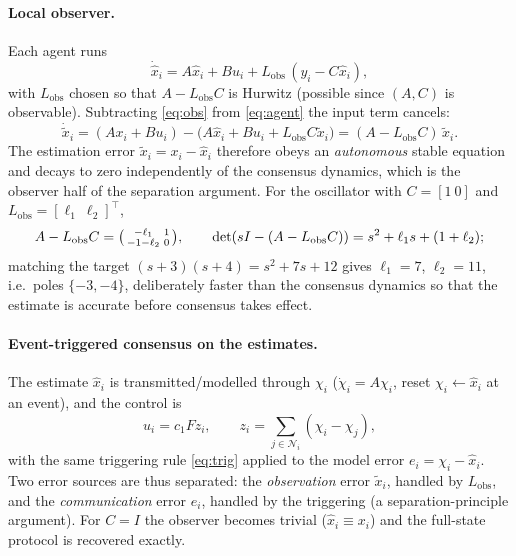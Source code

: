 \documentclass[11pt,a4paper]{article}
\theoremstyle{remark}
\newcommand{\Ni}{\mathcal{N}_i}
\newcommand{\T}{^{\top}}
\begin{document}
\paragraph{Local observer.} Each agent runs
\begin{equation}
\dot{\hat x}_i = A\hat x_i + B u_i + L_{\mathrm{obs}}\,(y_i - C\hat x_i),
\label{eq:obs}
\end{equation}
with $L_{\mathrm{obs}}$ chosen so that $A-L_{\mathrm{obs}}C$ is Hurwitz (possible since $(A,C)$ is
observable). Subtracting \eqref{eq:obs} from \eqref{eq:agent} the input term cancels:
\begin{equation}
\dot{\tilde x}_i = (Ax_i+Bu_i)-\big(A\hat x_i+Bu_i+L_{\mathrm{obs}}C\tilde x_i\big)
= (A-L_{\mathrm{obs}}C)\,\tilde x_i .
\label{eq:obs-err}
\end{equation}
The estimation error $\tilde x_i=x_i-\hat x_i$ therefore obeys an \emph{autonomous} stable equation
and decays to zero independently of the consensus dynamics, which is the observer half of the
separation argument. For the oscillator with $C=[1\ 0]$ and $L_{\mathrm{obs}}=[\ell_1\ \ell_2]\T$,
\[
A-L_{\mathrm{obs}}C=\begin{psmallmatrix}-\ell_1 & 1\\ -1-\ell_2 & 0\end{psmallmatrix},
\qquad \det(sI-(A-L_{\mathrm{obs}}C))=s^2+\ell_1 s+(1+\ell_2);
\]
matching the target $(s+3)(s+4)=s^2+7s+12$ gives $\ell_1=7$, $\ell_2=11$, i.e.\ poles $\{-3,-4\}$,
deliberately faster than the consensus dynamics so that the estimate is accurate before consensus
takes effect.

\paragraph{Event-triggered consensus on the estimates.} The estimate $\hat x_i$ is
transmitted/modelled through $\chi_i$ ($\dot\chi_i = A\chi_i$, reset
$\chi_i\!\leftarrow\!\hat x_i$ at an event), and the control is
\begin{equation}
u_i = c_1 F z_i,\qquad z_i = \sum_{j\in\Ni}(\chi_i - \chi_j),
\end{equation}
with the same triggering rule \eqref{eq:trig} applied to the model error
$e_i = \chi_i - \hat x_i$. Two error sources are thus separated: the \emph{observation} error
$\tilde x_i$, handled by $L_{\mathrm{obs}}$, and the \emph{communication} error $e_i$, handled by
the triggering (a separation-principle argument). For $C=I$ the observer becomes trivial
($\hat x_i\equiv x_i$) and the full-state protocol is recovered exactly.
\end{document}
